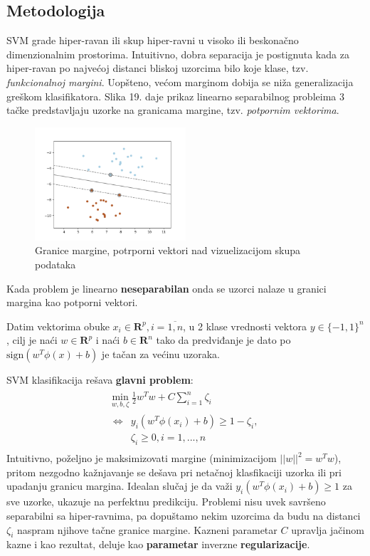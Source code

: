 \documentclass[fontsize=12bp, paper=a4]{scrarticle}
\begin{document}
\subsection{Metodologija}
SVM grade hiper-ravan ili skup hiper-ravni u visoko ili beskonačno dimenzionalnim prostorima. Intuitivno, dobra separacija je postignuta kada za hiper-ravan po najvećoj distanci bliskoj uzorcima bilo koje klase, tzv. \textit{funkcionalnoj margini}. Uopšteno, većom marginom dobija se niža generalizacija greškom klasifikatora. Slika 19. daje prikaz linearno separabilnog probleima 3 tačke predstavljaju uzorke na granicama margine, tzv. \textit{potpornim vektorima}.

\begin{figure}[h!]
    \centering
    \includegraphics[width=0.5\textwidth]{image-17.png}
    \caption{Granice margine, potrporni vektori nad vizuelizacijom skupa podataka}
\end{figure}

Kada problem je linearno \textbf{neseparabilan} onda se uzorci nalaze u granici margina kao potporni vektori.

Datim vektorima obuke $x_i \in \mathbf{R}^p, i=\overline{1,n}$, u 2 klase vrednosti vektora $y \in \{-1, 1\}^n$, cilj je naći $w \in \mathbf{R}^p$ i naći $b\in \mathbf{R}^n$ tako da predviđanje je dato po $\text{sign} (w^T\phi(x) + b)$ je tačan za većinu uzoraka.

SVM klasifikacija rešava \textbf{glavni problem}:
$$\begin{aligned}\begin{aligned}
    \min_ {w, b, \zeta} \frac{1}{2} w^T w + C \sum_{i=1}^{n} \zeta_i \\
    \begin{aligned}
        \iff & y_i (w^T \phi (x_i) + b) \geq 1 - \zeta_i, \\
                              & \zeta_i \geq 0, i=1, ..., n
    \end{aligned}
\end{aligned}\end{aligned}$$
Intuitivno, poželjno je maksimizovati margine (minimizacijom $||w||^2 = w^Tw$), pritom nezgodno kažnjavanje se dešava pri netačnoj klasfikaciji uzorka ili pri upadanju granicu margina. Idealan slučaj je da važi $y_i (w^T \phi (x_i) + b) \ge 1$ za sve uzorke, ukazuje na perfektnu predikciju. Problemi nisu uvek savršeno separabilni sa hiper-ravnima, pa dopuštamo nekim uzorcima da budu na distanci $\zeta_i$ naspram njihove tačne granice margine. Kazneni parametar $C$ upravlja jačinom kazne i kao rezultat, deluje kao \textbf{parametar} inverzne \textbf{regularizacije}.
\end{document}
